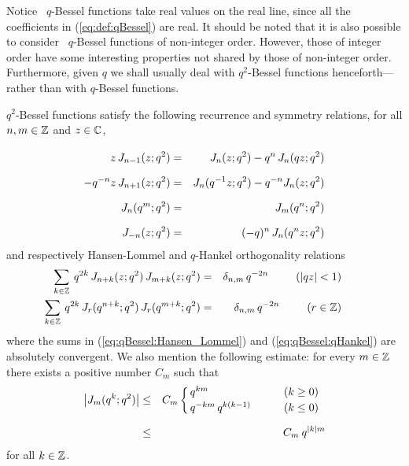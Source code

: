 \begin{remark_sec} \rm
Notice \little\ $q$-Bessel functions take real values on the real line,
since all the coefficients in (\ref{eq:def:qBessel}) are real.
It should be noted that it is also possible to consider \little\ $q$-Bessel
functions of non-integer order. However, those
of integer order have some interesting properties not shared
by those of non-integer order.
Furthermore, given $q$ we shall usually deal with $q^2$-Bessel functions
henceforth---rather than with $q$-Bessel functions.
\end{remark_sec}



\begin{prop_sec} \label{prop:qbessel:properties}
\Little\/ $q^2$-Bessel functions satisfy the following
recurrence and symmetry relations, for all\/ $n,m \in \mathbb{Z}$ and\/ $z\in\mathbb{C}$,
\begin{eqnarray}
 z\,\J{n-1}{z} &=& \J{n}{z} - q^n\,\J{n}{qz} \vertXL
     \label{eq:qBessel:recurrence1} \\
 -q^{-n} z\, \J{n+1}{z} &=& \J{n}{q^{-1}z} - q^{-n} \J{n}{z} \vertXL
    \label{eq:qBessel:recurrence2} \\
 \J{n}{q^m} &=& \J{m}{q^n} \vertXL
    \label{eq:qBessel:symmetry}\\
 \J{-n}{z} &=& (-q)^n\, \J{n}{q^n z} \vertXL
    \label{eq:qBessel:inversion}
\end{eqnarray}
and respectively Hansen-Lommel and\/ $q$-Hankel orthogonality relations
\begin{eqnarray}
 \sum_{k\in \mathbb{Z}} \: q^{2k}\, J_{n+k}(z; q^2) \,J_{m+k}(z; q^2)
  &=& \delta_{n,m} \,q^{-2n} \hspace{2.5em}  (|qz|<1)
    \hspace{2em}   \label{eq:qBessel:Hansen_Lommel} \\
 \sum_{k\in \mathbb{Z}} \: q^{2k} \,J_{r}(q^{n+k}; q^2) \,J_{r}(q^{m+k}; q^2)
  &=& \delta_{n,m} \,q^{-2n} \hspace{2.5em}  (r\in\mathbb{Z})
    \hspace{2em}  \label{eq:qBessel:qHankel}
\end{eqnarray}
where the sums in (\ref{eq:qBessel:Hansen_Lommel}) and (\ref{eq:qBessel:qHankel})
are absolutely convergent.
We also mention the following estimate:
for every\/ $m\in\mathbb{Z}$ there exists a positive number\/ $C_m$ such that
\begin{eqnarray}
  \left|\J{m}{q^k} \vertM\right|
&\leq&
  C_m   \left\{ \!\! \begin{array}{lcl}
              q^{km}                 &\hspace{1em}  &  (k \geq 0)  \\ \vertL
              q^{-km} \, q^{k(k-1)}  &              &  (k \leq 0)
           \end{array} \right. \label{eq:qBessel:estimate}
\\&\leq&
  C_m \: q^{|k|m} \vertXL  \label{eq:qBessel:estimate:bis}
\end{eqnarray}
for all\/ $k\in \mathbb{Z}$.
\end{prop_sec}

